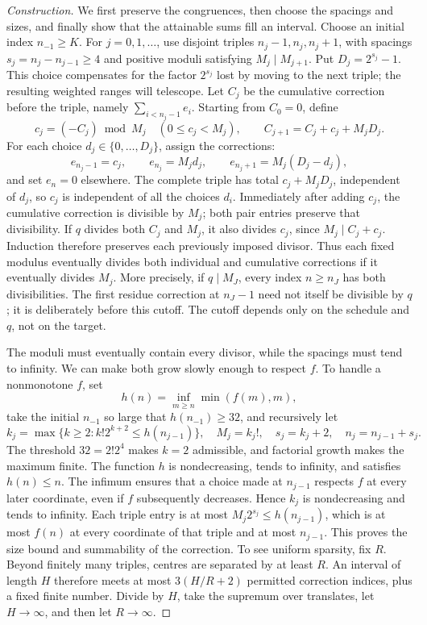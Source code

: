 \documentclass[11pt]{article}
\begin{document}
\begin{proof}[Construction]
We first preserve the congruences, then choose the spacings and sizes,
and finally show that the attainable sums fill an interval.
Choose an initial index $n_{-1}\ge K$.  For $j=0,1,\ldots$, use disjoint
triples $n_j-1,n_j,n_j+1$, with spacings $s_j=n_j-n_{j-1}\ge4$ and
positive moduli satisfying $M_j\mid M_{j+1}$.
Put $D_j=2^{s_j}-1$.  This choice compensates for the factor $2^{s_j}$
lost by moving to the next triple; the resulting weighted ranges will
telescope.  Let $C_j$ be the cumulative correction before the triple,
namely $\sum_{i<n_j-1}e_i$.
Starting from $C_0=0$, define
\[
 c_j=(-C_j)\bmod M_j\quad(0\le c_j<M_j),\qquad
 C_{j+1}=C_j+c_j+M_jD_j.
\]
For each choice $d_j\in\{0,\ldots,D_j\}$, assign the corrections:
\[
 e_{n_j-1}=c_j,\qquad e_{n_j}=M_jd_j,\qquad
 e_{n_j+1}=M_j(D_j-d_j),
\]
and set $e_n=0$ elsewhere.  The complete triple has total
$c_j+M_jD_j$, independent of $d_j$, so $c_j$ is independent of all the choices $d_i$.
Immediately after adding $c_j$, the cumulative correction is divisible
by $M_j$; both pair entries preserve that divisibility.  If $q$ divides
both $C_j$ and $M_j$, it also divides $c_j$, since $M_j\mid C_j+c_j$.
Induction therefore preserves each previously imposed divisor.  Thus each fixed
modulus eventually divides both individual and cumulative corrections if
it eventually divides $M_j$.  More precisely, if $q\mid M_J$, every
index $n\ge n_J$ has both divisibilities.  The first residue correction at $n_J-1$
need not itself be divisible by $q$; it is deliberately before this cutoff.
The cutoff depends only on the schedule and $q$, not on the target.

The moduli must eventually contain every divisor, while the spacings
must tend to infinity.  We can make both grow slowly enough to respect
$f$.  To handle a nonmonotone $f$, set
\[
 h(n)=\inf_{m\ge n}\min(f(m),m),
\]
take the initial $n_{-1}$ so large that $h(n_{-1})\ge32$, and recursively let
\[
 k_j=\max\{k\ge2:k!2^{k+2}\le h(n_{j-1})\},\quad
 M_j=k_j!,\quad s_j=k_j+2,\quad n_j=n_{j-1}+s_j.
\]
The threshold $32=2!2^4$ makes $k=2$ admissible, and factorial growth
makes the maximum finite.  The function $h$ is nondecreasing, tends to
infinity, and satisfies $h(n)\le n$.  The infimum ensures that a choice
made at $n_{j-1}$ respects $f$ at every later coordinate, even if $f$
subsequently decreases.  Hence $k_j$ is nondecreasing and tends to infinity.  Each
triple entry is at most $M_j2^{s_j}\le h(n_{j-1})$, which is at most $f(n)$
at every coordinate of that triple and at most $n_{j-1}$.  This proves the
size bound and summability of the correction.  To see uniform sparsity, fix $R$.  Beyond finitely many triples, centres
are separated by at least $R$.  An interval of length $H$ therefore meets
at most $3(H/R+2)$ permitted correction indices, plus a fixed finite number.
Divide by $H$, take the supremum over translates, let $H\to\infty$,
and then let $R\to\infty$.


\end{proof}
\end{document}
